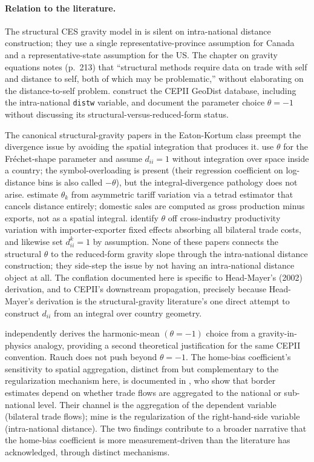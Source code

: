 \documentclass[11pt, letterpaper]{article}
\theoremstyle{definition}
\begin{document}
\paragraph{Relation to the literature.}
The structural CES gravity model in \citet{anderson_vanwincoop_2003} is
silent on intra-national distance construction; they use a single
representative-province assumption for Canada and a representative-state
assumption for the US. The \citet{head_mayer_2014_handbook} chapter on
gravity equations notes (p.~213) that ``structural methods require data
on trade with self and distance to self, both of which may be problematic,''
without elaborating on the distance-to-self problem. \citet{mayer_zignago_2011}
construct the CEPII GeoDist database, including the intra-national
\texttt{distw} variable, and document the parameter choice $\theta = -1$
without discussing its structural-versus-reduced-form status.

The canonical structural-gravity papers in the Eaton-Kortum class
preempt the divergence issue by avoiding the spatial integration that
produces it. \citet{eaton_kortum_2002} use $\theta$ for the
Fr\'echet-shape parameter and assume $d_{ii} = 1$ without integration
over space inside a country; the symbol-overloading is present
(their regression coefficient on log-distance bins is also called
$-\theta$), but the integral-divergence pathology does not arise.
\citet{caliendo_parro_2015} estimate $\theta_k$ from asymmetric tariff
variation via a tetrad estimator that cancels distance entirely;
domestic sales are computed as gross production minus exports, not as
a spatial integral. \citet{costinot_donaldson_komunjer_2012} identify
$\theta$ off cross-industry productivity variation with importer-exporter
fixed effects absorbing all bilateral trade costs, and likewise set
$d_{ii}^k = 1$ by assumption. None of these papers connects the
structural $\theta$ to the reduced-form gravity slope through the
intra-national distance construction; they side-step the issue by
not having an intra-national distance object at all. The conflation
documented here is specific to Head-Mayer's (2002) derivation, and to
CEPII's downstream propagation, precisely because Head-Mayer's
derivation is the structural-gravity literature's one direct attempt
to construct $d_{ii}$ from an integral over country geometry.

\citet{rauch_2016_geometry} independently derives the harmonic-mean
$(\theta = -1)$ choice from a gravity-in-physics analogy, providing a
second theoretical justification for the same CEPII convention. Rauch
does not push beyond $\theta = -1$. The home-bias coefficient's
sensitivity to spatial aggregation, distinct from but complementary to
the regularization mechanism here, is documented in
\citet{coughlin_novy_2021_border}, who show that border estimates
depend on whether trade flows are aggregated to the national or
sub-national level. Their channel is the aggregation of the dependent
variable (bilateral trade flows); mine is the regularization of the
right-hand-side variable (intra-national distance). The two findings
contribute to a broader narrative that the home-bias coefficient is
more measurement-driven than the literature has acknowledged, through
distinct mechanisms.
\end{document}
